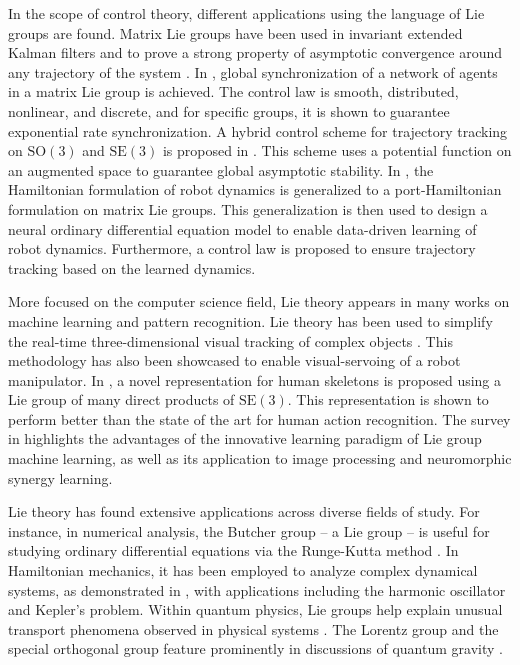 In the scope of control theory, different applications using the language of Lie groups are found. Matrix Lie groups have been used in invariant extended Kalman filters and to prove a strong property of asymptotic convergence around any trajectory of the system \citep{Barrau2017}. In \citet{Mccarthy2020}, global synchronization of a network of agents in a matrix Lie group is achieved. The control law is smooth, distributed, nonlinear, and discrete, and for specific groups, it is shown to guarantee exponential rate synchronization. A hybrid control scheme for trajectory tracking on $\text{SO}(3)$ and $\text{SE}(3)$ is proposed in \citet{Wang2022}. This scheme uses a potential function on an augmented space to guarantee global asymptotic stability. In \citet{Duong2024}, the Hamiltonian formulation of robot dynamics is generalized to a port-Hamiltonian formulation on matrix Lie groups. This generalization is then used to design a neural ordinary differential equation model to enable data-driven learning of robot dynamics. Furthermore, a control law is proposed to ensure trajectory tracking based on the learned dynamics.

More focused on the computer science field, Lie theory appears in many works on machine learning and pattern recognition. Lie theory has been used to simplify the real-time three-dimensional visual tracking of complex objects \citep{Drummond2002}. This methodology has also been showcased to enable visual-servoing of a robot manipulator. In \citet{Vemulapalli2014}, a novel representation for human skeletons is proposed using a Lie group of many direct products of $\text{SE}(3)$. This representation is shown to perform better than the state of the art for human action recognition. The survey in \citet{Lu2020} highlights the advantages of the innovative learning paradigm of Lie group machine learning, as well as its application to image processing and neuromorphic synergy learning.

Lie theory has found extensive applications across diverse fields of study. For instance, in numerical analysis, the Butcher group -- a Lie group -- is useful for studying ordinary differential equations via the Runge-Kutta method \citep{Bogfjellmo2017}. In Hamiltonian mechanics, it has been employed to analyze complex dynamical systems, as demonstrated in \citet{Hamburger2009}, with applications including the harmonic oscillator and Kepler's problem. Within quantum physics, Lie groups help explain unusual transport phenomena observed in physical systems \citep{Ilievski2021}. The Lorentz group and the special orthogonal group feature prominently in discussions of quantum gravity \citep{Dreyer2003,Kapec2017}.
